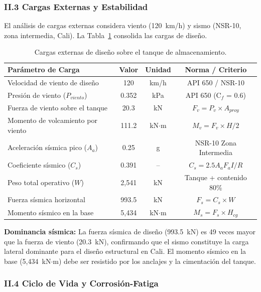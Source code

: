 \subsubsection*{II.3 Cargas Externas y Estabilidad}

El análisis de cargas externas considera viento (120~km/h) y sismo (NSR-10, zona intermedia, Cali). La Tabla~\ref{tab:resumen_cargas_externas} consolida las cargas de diseño.

\begin{table}[H]
\centering
\caption{Cargas externas de diseño sobre el tanque de almacenamiento.}
\label{tab:resumen_cargas_externas}
\setcounter{itemcount}{0}
\begin{tabularx}{\textwidth}{@{}Xccc@{}}
\toprule
\textbf{Parámetro de Carga} & \textbf{Valor} & \textbf{Unidad} & \textbf{Norma / Criterio} \\
\midrule
Velocidad de viento de diseño & 120 & km/h & API 650 / NSR-10 \\
Presión de viento ($P_{viento}$) & 0.352 & kPa & API 650 (C$_f$ = 0.6) \\
Fuerza de viento sobre el tanque & 20.3 & kN & $F_v = P_v \times A_{proy}$ \\
Momento de volcamiento por viento & 111.2 & kN$\cdot$m & $M_v = F_v \times H/2$ \\
\midrule
Aceleración sísmica pico ($A_a$) & 0.25 & g & NSR-10 Zona Intermedia \\
Coeficiente sísmico ($C_s$) & 0.391 & -- & $C_s = 2.5 A_a F_a I / R$ \\
Peso total operativo ($W$) & 2,541 & kN & Tanque + contenido 80\% \\
Fuerza sísmica horizontal & 993.5 & kN & $F_s = C_s \times W$ \\
Momento sísmico en la base & 5,434 & kN$\cdot$m & $M_s = F_s \times H_{cg}$ \\
\bottomrule
\end{tabularx}
\end{table}

\textbf{Dominancia sísmica:} La fuerza sísmica de diseño (993.5~kN) es 49 veces mayor que la fuerza de viento (20.3~kN), confirmando que el sismo constituye la carga lateral dominante para el diseño estructural en Cali. El momento sísmico en la base (5,434~kN$\cdot$m) debe ser resistido por los anclajes y la cimentación del tanque.

\subsubsection*{II.4 Ciclo de Vida y Corrosión-Fatiga}


